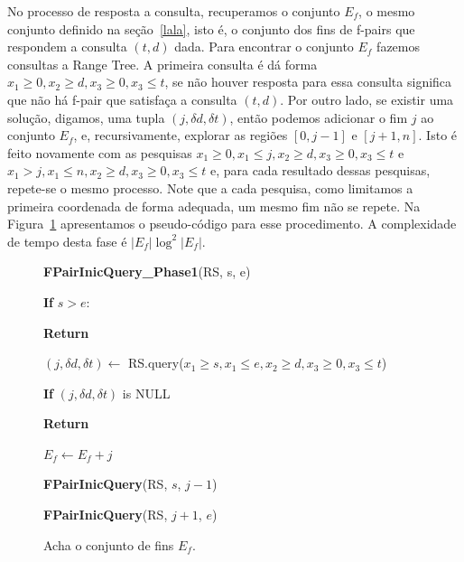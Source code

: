 \documentclass[12pt]{article}
\begin{document}
No processo de resposta a consulta, recuperamos o conjunto $E_f$, o mesmo
conjunto definido na seção~\ref{lala}, isto é, o conjunto dos fins de f-pairs que
respondem a consulta $(t, d)$ dada. Para encontrar o conjunto $E_f$ fazemos consultas a
Range Tree. A primeira consulta é dá forma $x_1 \ge 0,  x_2 \ge d,  x_3 \ge 0, x_3 \le t$, se não
houver resposta para essa consulta significa que não há f-pair que satisfaça a consulta $(t,d)$.
Por outro lado, se existir uma solução, digamos, uma tupla $(j, \delta d, \delta t)$, então
podemos adicionar o fim $j$ ao conjunto $E_f$, e, recursivamente, explorar as regiões $[0, j - 1]$ e $[j + 1, n]$.
Isto é feito novamente com as pesquisas $x_1 \ge 0, x_1 \le j, x_2 \ge d, x_3 \ge 0, x_3 \le t$ e 
$x_1 > j, x_1 \le n, x_2 \ge d, x_3 \ge 0, x_3 \le t$ e, para cada resultado dessas pesquisas, repete-se
o mesmo processo. Note que a cada pesquisa, como limitamos a primeira coordenada de forma adequada, um 
mesmo fim não se repete. Na Figura~\ref{fpairinicqueryphase1} apresentamos o pseudo-código para esse procedimento.
A complexidade de tempo desta fase é $|E_f| \log^2 |E_f|$.

\begin{figure}
\begin{framed}
{\bf FPairInicQuery\_Phase1}(RS, s, e)

\hspace{1cm} {\bf If } $s > e$:

\hspace{2cm} {\bf Return}

\hspace{1cm} $(j, \delta d, \delta t) \leftarrow $ RS.query($x_1 \ge s,  x_1 \le e,  x_2 \ge d,  x_3 \ge 0, x_3 \le t$)

\hspace{1cm} {\bf If} $(j, \delta d, \delta t)$ is NULL

\hspace{2cm} {\bf Return}

\hspace{1cm} $E_f \leftarrow E_f + j$

\hspace{1cm} {\bf FPairInicQuery}(RS, $s$, $j - 1$)

\hspace{1cm} {\bf FPairInicQuery}(RS, $j + 1$, $e$)

\end{framed}
\caption{Acha o conjunto de fins $E_f$.}
\label{fpairinicqueryphase1}
\end{figure}
\end{document}

